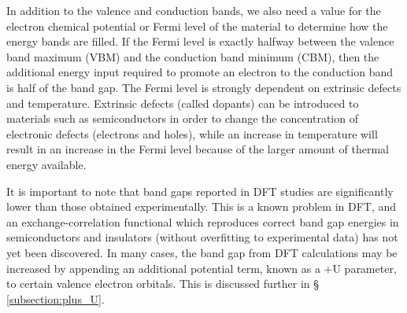 In addition to the valence and conduction bands, we also need a value for the electron chemical potential or Fermi level of the material to determine how the energy bands are filled. If the Fermi level is exactly halfway between the valence band maximum (VBM) and the conduction band minimum (CBM), then the additional energy input required to promote an electron to the conduction band is half of the band gap. The Fermi level is strongly dependent on extrinsic defects and temperature. Extrinsic defects (called dopants) can be introduced to materials such as semiconductors in order to change the concentration of electronic defects (electrons and holes), while an increase in temperature will result in an increase in the Fermi level because of the larger amount of thermal energy available.

It is important to note that band gaps reported in DFT studies are significantly lower than those obtained experimentally. This is a known problem in DFT, and an exchange-correlation functional which reproduces correct band gap energies in semiconductors and insulators (without overfitting to experimental data) has not yet been discovered. In many cases, the band gap from DFT calculations may be increased by appending an additional potential term, known as a +U parameter, to certain valence electron orbitals. This is discussed further in § \ref{subsection:plus_U}.







